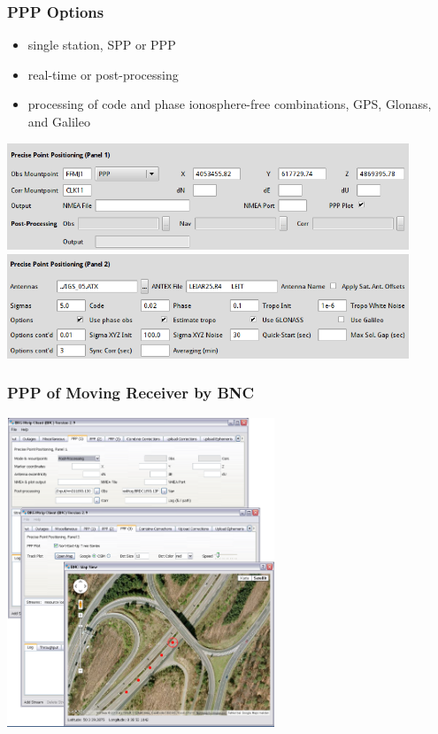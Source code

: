 \documentclass[10pt]{beamer}
\begin{document}

\begin{frame}
  \frametitle{PPP Options}
  \begin{itemize}
  \item single station, SPP or PPP
  \item real-time or post-processing
  \item processing of code and phase ionosphere-free combinations, GPS,
    Glonass, and Galileo
  \end{itemize}
  \begin{center}
    \includegraphics[width=0.9\textwidth,angle=0]{ppp_opt1.png} \\[2mm]
    \includegraphics[width=0.9\textwidth,angle=0]{ppp_opt2.png}
  \end{center}
\end {frame}


\begin{frame}
\frametitle{PPP of Moving Receiver by BNC}
  \begin{center}
    \includegraphics[width=0.6\textwidth,angle=0]{screenshot32.png}
  \end{center}
\end{frame}
\end{document}
